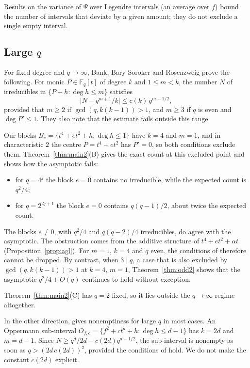 \documentclass[11pt,a4paper]{amsart}
\theoremstyle{definition}
\theoremstyle{remark}
\newcommand{\F}{\mathbb{F}}
\begin{document}
Results on the variance of $\Psi$ over Legendre intervals (an average over $f$) bound the number of intervals that
deviate by a given amount; they do not exclude a single empty interval.

\subsection{\texorpdfstring{Large $q$}{Large q}}\label{subsec:bbr}
For fixed degree and $q\to\infty$, Bank, Bary-Soroker and Rosenzweig \cite{BBR} prove the following. For monic
$P\in\F_q[t]$ of degree $k$ and $1\le m<k$, the number $N$ of irreducibles in $\{P+h:\deg h\le m\}$ satisfies
\[
\bigl|N-q^{m+1}/k\bigr|\le c(k)\,q^{m+1/2},
\]
provided that $m\ge2$ if $\gcd(q,k(k-1))>1$, and $m\ge3$ if $q$ is even and $\deg P'\le1$. They also note that the
estimate fails outside this range.

Our blocks $B_e=\{t^4+et^2+h:\deg h\le1\}$ have $k=4$ and $m=1$, and in characteristic $2$ the centre
$P=t^4+et^2$ has $P'=0$, so both conditions exclude them. Theorem~\ref{thm:main2}(B) gives the exact count at this
excluded point and shows how the asymptotic fails:
\begin{itemize}
\item for $q=4^j$ the block $e=0$ contains no irreducible, while the expected count is $q^2/4$;
\item for $q=2^{2j+1}$ the block $e=0$ contains $q(q-1)/2$, about twice the expected count.
\end{itemize}
The blocks $e\ne0$, with $q^2/4$ and $q(q-2)/4$ irreducibles, do agree with the asymptotic. The obstruction comes
from the additive structure of $t^4+et^2+\alpha t$ (Proposition~\ref{prop:agl}). For $m=1$, $k=4$ and $q$ even,
the conditions of \cite{BBR} therefore cannot be dropped. By contrast, when $3\mid q$, a case that is also excluded by
$\gcd(q,k(k-1))>1$ at $k=4$, $m=1$, Theorem~\ref{thm:odd2} shows that the asymptotic $q^2/4+O(q)$ continues to hold
without exception.

Theorem~\ref{thm:main2}(C) has $q=2$ fixed, so it lies outside the $q\to\infty$ regime altogether.

In the other direction, \cite{BBR} gives nonemptiness for large $q$ in most cases. An Oppermann sub-interval
$O_{f,c}=\{f^2+ct^d+h:\deg h\le d-1\}$ has $k=2d$ and $m=d-1$. Since $N\ge q^d/2d-c(2d)q^{d-1/2}$, the
sub-interval is nonempty as soon as $q>(2d\,c(2d))^2$, provided the conditions of \cite{BBR} hold. We do not make the
constant $c(2d)$ explicit.
\end{document}
